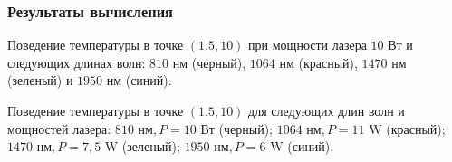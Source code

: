 \begin{frame}
    \frametitle{Результаты вычисления}
    \begin{minipage}[t]{0.47\linewidth}
        \small{Поведение температуры в точке $(1.5,10)$
            при мощности лазера $10\text{~Вт}$ и следующих длинах волн:
            $810\text{~нм}$ (черный), $1064\text{~нм}$ (красный),
            $1470\text{~нм}$ (зеленый) и $1950\text{~нм}$ (синий).}
    \end{minipage}
    \hfill
    \begin{minipage}[t]{0.47\linewidth}
        \small{Поведение температуры в точке $(1.5,10)$
            для следующих длин волн и мощностей лазера:
            $810 \text{~нм}, P=10 \text{~Вт}$ (черный);
            $1064 \text{~нм}, P=11 \text{~W}$ (красный);
            $1470 \text{~нм}, P=7,5 \text{~W}$ (зеленый);
            $1950 \text{~нм}, P=6 \text{~W}$ (синий).}
    \end{minipage}
\end{frame}

\begin{frame}

\end{frame}
